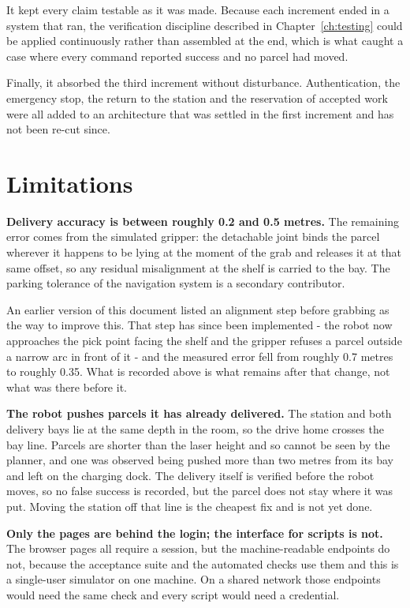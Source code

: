 \documentclass[12pt,a4paper]{report}
\begin{document}
It kept every claim testable as it was made. Because each increment ended in a system that ran, the
verification discipline described in Chapter~\ref{ch:testing} could be applied continuously rather
than assembled at the end, which is what caught a case where every command reported success and no
parcel had moved.

Finally, it absorbed the third increment without disturbance. Authentication, the emergency stop,
the return to the station and the reservation of accepted work were all added to an architecture
that was settled in the first increment and has not been re-cut since.
\chapter{Limitations}
\label{ch:limitations}


\textbf{Delivery accuracy is between roughly 0.2 and 0.5 metres.} The remaining error comes from
the simulated gripper: the detachable joint binds the parcel wherever it happens to be lying at the
moment of the grab and releases it at that same offset, so any residual misalignment at the shelf
is carried to the bay. The parking tolerance of the navigation system is a secondary contributor.

An earlier version of this document listed an alignment step before grabbing as the way to improve
this. That step has since been implemented - the robot now approaches the pick point facing the
shelf and the gripper refuses a parcel outside a narrow arc in front of it - and the measured error
fell from roughly 0.7 metres to roughly 0.35. What is recorded above is what remains after that
change, not what was there before it.

\textbf{The robot pushes parcels it has already delivered.} The station and both delivery bays lie
at the same depth in the room, so the drive home crosses the bay line. Parcels are shorter than the
laser height and so cannot be seen by the planner, and one was observed being pushed more than two
metres from its bay and left on the charging dock. The delivery itself is verified before the robot
moves, so no false success is recorded, but the parcel does not stay where it was put. Moving the
station off that line is the cheapest fix and is not yet done.

\textbf{Only the pages are behind the login; the interface for scripts is not.} The browser pages
all require a session, but the machine-readable endpoints do not, because the acceptance suite and
the automated checks use them and this is a single-user simulator on one machine. On a shared network
those endpoints would need the same check and every script would need a credential.
\end{document}
